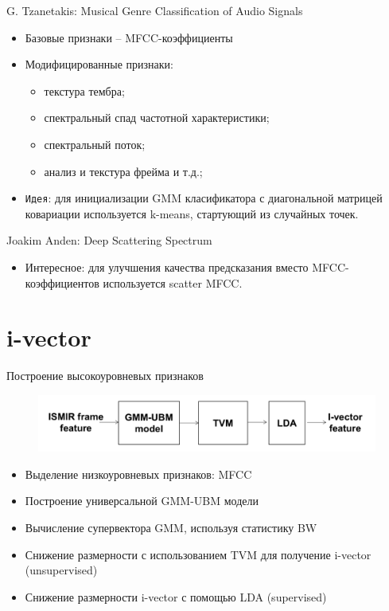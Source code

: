 \documentclass[xcolor=svgnames,handout]{beamer}
\begin{document}
\begin{frame}
  \begin{block}{G. Tzanetakis: Musical Genre Classification of Audio Signals}
  \begin{itemize}
      \item Базовые признаки -- MFCC-коэффициенты
      \item Модифицированные признаки:
      \begin{itemize}
          \item текстура тембра;
          \item спектральный спад частотной характеристики;
          \item спектральный поток;
          \item анализ и текстура фрейма и т.д.;
      \end{itemize}
      \item \texttt{Идея}: для инициализации GMM класификатора с диагональной матрицей ковариации используется k-means, стартующий из случайных точек.
  \end{itemize}
  \end{block}
  \begin{block}{Joakim Anden: Deep Scattering Spectrum}
  \begin{itemize}
      \item Интересное: для улучшения качества предсказания вместо MFCC-коэффициентов используется scatter MFCC.
  \end{itemize}
  \end{block}
\end{frame}  

\section
  {i-vector}


\begin{frame}
  {Построение высокоуровневых признаков}
\begin{figure}[t]
    \centering
    \includegraphics[width = 0.95\linewidth]{pipe.png}
  \end{figure}
  
    \begin{itemize}
    \item Выделение низкоуровневых признаков: MFCC
    \item Построение универсальной GMM-UBM модели
    \item Вычисление супервектора GMM, используя статистику BW 
    \item Снижение размерности с использованием TVM для получение i-vector (unsupervised)
    \item Снижение размерности i-vector с помощью LDA (supervised)
    \end{itemize}

\end{frame}
\end{document}
